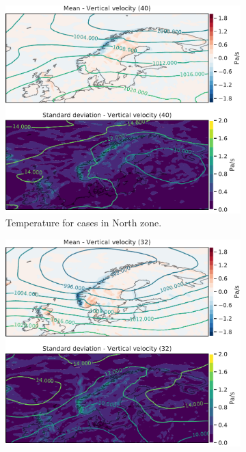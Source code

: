 \begin{figure}
\begin{subfigure}[b]{0.49\textwidth}
    \centering
    \includegraphics[width=\textwidth]{Figures/WNord.pdf}
    \caption{Temperature for cases in North zone.}
    \label{fig:NordW}
\end{subfigure}
\begin{subfigure}[b]{0.49\textwidth}
    \centering
    \includegraphics[width=\textwidth]{Figures/WNordvest.pdf}

\end{subfigure}
\end{figure}
